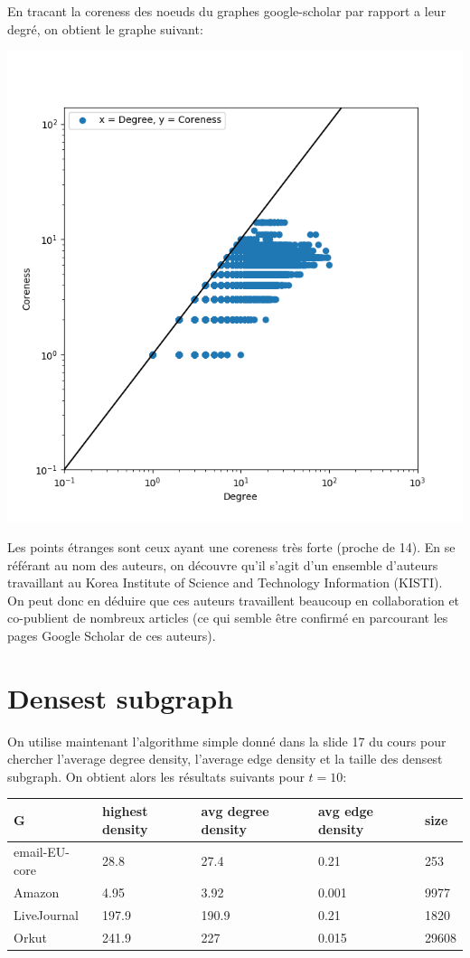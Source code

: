 \documentclass{report}
\begin{document}
En tracant la coreness des noeuds du graphes google-scholar par rapport a leur degré, on obtient le graphe suivant:
\begin{center}
  \includegraphics[height=.30\paperwidth]{assets/scholardegreecoreness.png}
\end{center}

Les points étranges sont ceux ayant une coreness très forte (proche de 14). En se référant au nom des auteurs, on découvre qu'il s'agit d'un ensemble d'auteurs travaillant au Korea Institute of Science and Technology Information (KISTI). On peut donc en déduire que ces auteurs travaillent beaucoup en collaboration et co-publient de nombreux articles (ce qui semble être confirmé en parcourant les pages Google Scholar de ces auteurs).

\section{Densest subgraph}
On utilise maintenant l'algorithme simple donné dans la slide 17 du cours pour chercher l'average degree density, l'average edge density et la taille des densest subgraph. On obtient alors les résultats suivants pour $t=10$:
\begin{center}
  \begin{tabular}{|l|l|l|l|l|}
    \hline
    G & highest density & avg degree density & avg edge density & size\\
    \hline
    email-EU-core & 28.8 & 27.4 & 0.21 & 253\\
    Amazon & 4.95 & 3.92 & 0.001 & 9977 \\
    LiveJournal & 197.9 & 190.9 & 0.21 & 1820 \\
    Orkut & 241.9 & 227 & 0.015 & 29608 \\
    \hline
  \end{tabular}
\end{center}
\end{document}
